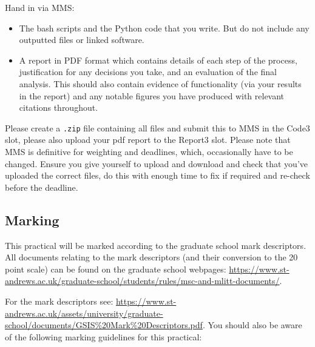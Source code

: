 \documentclass[a4paper,11pt]{article}
\begin{document}
Hand in via MMS:

\begin{itemize}
\item The bash scripts and the Python code that you write. But do not include any outputted files or linked software.
\item A report in PDF format which contains details of each step of the process, justification for any decisions you take, and an evaluation of the final analysis. This should also contain evidence of functionality (via your results in the report) and any notable figures you have produced with relevant citations throughout.
\end{itemize}

\noindent
Please create a \texttt{.zip} file containing all files and submit this to MMS in the Code3 slot, please also upload your pdf report to the Report3 slot. Please note that MMS is definitive for weighting and deadlines, which, occasionally have to be changed. Ensure you give yourself to upload and download and check that you've uploaded the correct files, do this with enough time to fix if required and re-check before the deadline.


\subsection*{Marking}

This practical will be marked according to the graduate school mark descriptors. All documents relating to the mark descriptors (and their conversion to the 20 point scale) can be found on the graduate school webpages: \url{https://www.st-andrews.ac.uk/graduate-school/students/rules/msc-and-mlitt-documents/}.

For the mark descriptors see: \href{https://www.st-andrews.ac.uk/assets/university/graduate-school/documents/GSIS\%20Mark\%20Descriptors.pdf}{https://www.st-andrews.ac.uk/assets/university/graduate-school/documents/GSIS\%20Mark\%20Descriptors.pdf}. You should also be aware of the following marking guidelines for this practical:
\end{document}
